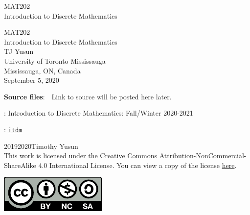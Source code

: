 \documentclass[oneside,10pt,]{book}
\newcommand{\titlepagefont}{\relax}
\newcommand{\mono}[1]{\texttt{#1}}
\numberwithin{equation}{section}
\begin{document}
\frontmatter
\thispagestyle{empty}
{\titlepagefont\centering
\vspace*{0.28\textheight}
{\Huge \sf MAT202 \\[2em] \centering Introduction to Discrete Mathematics \\ }}
\clearpage
\thispagestyle{empty}
\null%
\clearpage
\thispagestyle{empty}
{\titlepagefont\centering
\vspace*{0.14\textheight}
{\Huge \centering \sf MAT202 \\[2em] Introduction to Discrete Mathematics}\\[3\baselineskip]
{\Large TJ Yusun}\\[0.5\baselineskip]
{\Large University of Toronto Mississauga\\
Mississauga, ON, Canada}\\[3\baselineskip]
{\Large September 5, 2020}\\}
\clearpage
\thispagestyle{empty}
\hypertarget{x:colophon:colophon}{}
\par\noindent
\textbf{Source files}:\ \ Link to source will be posted here later. 
\par{}
: Introduction to Discrete Mathematics: Fall\slash{}Winter 2020-2021\par\medskip
{}: \href{https://tjyusun.com/MAT202}{\mono{itdm}}\par\medskip
\noindent\textcopyright{}2019\textendash{}2020\quad{}Timothy Yusun\\[0.5\baselineskip]
This work is licensed under the Creative Commons Attribution-NonCommercial-ShareAlike 4.0 International License. You can view a copy of the license \href{http://creativecommons.org/licenses/by-nc-sa/4.0/}{here}. \begin{image}{0.375}{0.25}{0.375}%
\includegraphics[width=\linewidth]{figs/by-nc-sa}
\end{image}%
\end{document}
